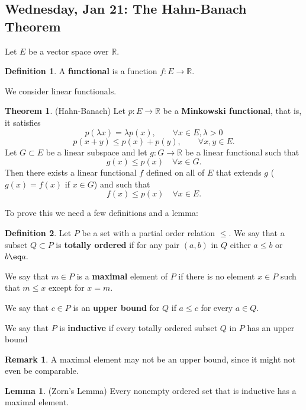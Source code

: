 \documentclass[10pt, oneside]{article}
\newcommand{\bbR}{\mathbb{R}}
\theoremstyle{definition}
\newtheorem{thm}{Theorem}
\newtheorem{defn}{Definition}
\newtheorem{rem}{Remark}
\newtheorem{lem}{Lemma}
\begin{document}
\subsection{Wednesday, Jan 21: The Hahn-Banach Theorem}
Let $E$ be a vector space over $\bbR.$ 
\begin{defn}
    A \textbf{functional} is a function $f: E \to \bbR.$ 
\end{defn}
We consider linear functionals.
\begin{thm}
    (Hahn-Banach) Let $p: E\to \bbR$ be a \textbf{Minkowski functional}, that is, it satisfies
    \[p(\lambda x)  =\lambda p(x), \qquad \forall x\in E, \lambda>0\]
    \[p(x + y) \leq p(x) + p(y), \qquad \forall x,y \in E.\] Let $G \subset E$ be a linear subspace and let $g: G \to \bbR$ be a linear functional such  that 
    \[g(x)\leq p(x) \quad \forall x\in G.\] Then there exists a linear functional $f$ defined on all of $E$ that extends $g$ ($g(x) = f(x)$ if $x\in G$) and such that 
    \[f(x)\leq p(x)\quad \forall x\in E.\]
\end{thm}
To prove this we need a few definitions and a lemma:
\begin{defn}
    Let $P$ be a set with a partial order relation $\leq.$ We say that a subset $Q\subset P$ is \textbf{totally ordered} if for any pair $(a,b)$ in $Q$ either $a\leq b$ or $b\eq a.$
    
    We say that $m\in P$ is a \textbf{maximal} element of $P$ if there is no element $x\in P$ such that $m\leq x$ except for $x = m.$ 
    
    We say that $c\in P$ is an \textbf{upper bound} for $Q$ if $a\leq c$ for every $a\in Q.$ 
    
    We say that $P$ is \textbf{inductive} if every totally ordered subset $Q$ in $P$ has an upper bound
\end{defn}
\begin{rem}
    A maximal element may not be an upper bound, since it might not even be comparable. 
\end{rem}

\begin{lem}
    (Zorn's Lemma) Every nonempty ordered set that is inductive has a maximal element.
\end{lem}
\end{document}
